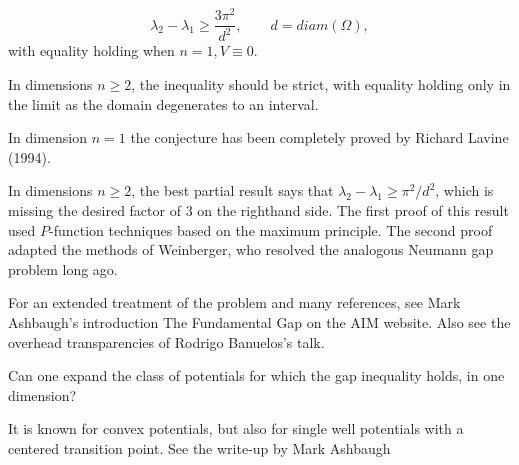 \documentclass[12pt,letterpaper, reqno]{amsart}
\begin{document}
\begin{problemblock}

\begin{conjecture}[3.1]
\[
\lambda_2 - \lambda_1 \geq \frac{3\pi^2}{d^2} , \qquad d={diam}(\Omega) ,
\]
with equality holding when $n=1, V \equiv 0$.
\end{conjecture}

\begin{distinguishedremark}
In dimensions $n \geq
2$, the inequality should be strict, with equality holding only in
the limit as the domain degenerates to an interval.
\end{distinguishedremark}

\begin{remark}
In dimension $n=1$ the conjecture has been completely proved by
Richard Lavine (1994).
\end{remark}

\begin{remark}
In dimensions $n \geq 2$, the best partial result says that
$\lambda_2 - \lambda_1 \geq \pi^2/d^2$, which is missing the desired
factor of $3$ on the righthand side. The first proof of this result
used $P$-function techniques based on the maximum principle. The
second proof adapted the methods of Weinberger, who resolved the
analogous Neumann gap problem long ago.
\end{remark}

\begin{remark}
For an extended treatment of the problem and many references, see
Mark Ashbaugh's introduction The Fundamental Gap on the AIM
website. Also see the overhead transparencies of Rodrigo Banuelos's
talk.
\end{remark}
\end{problemblock}


\begin{problemblock}

\begin{problem}[3.15]  
Can one expand the class of
potentials for which the gap inequality holds, in one dimension? 
\end{problem}

\begin{distinguishedremark}
It
is known for convex potentials, but also for single well potentials
with a centered transition point. See the write-up by Mark Ashbaugh
\end{distinguishedremark}

\end{problemblock}
\end{document}
